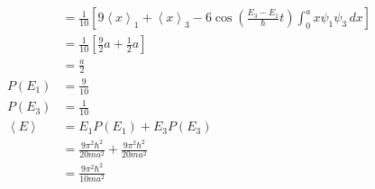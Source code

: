 \documentclass{article}
\newcommand{\ev}[1]{\left< #1 \right>}
\begin{document}
\begin{align*}
             & = \frac{1}{10} \left[ 9 \ev{x}_1 + \ev{x}_3 - 6 \cos \left( \frac{E_3 - E_1}{\hbar} t \right) \int_0^a x \psi_1 \psi_3 \,d x \right]                               \\
             & = \frac{1}{10} \left[ \frac{9}{2} a + \frac{1}{2} a \right]                                                                                                        \\
             & = \frac{a}{2}                                                                                                                                                      \\
  P(E_1)     & = \frac{9}{10}                                                                                                                                                     \\
  P(E_3)     & = \frac{1}{10}                                                                                                                                                     \\
  \ev{E}     & = E_1 P(E_1) + E_3 P(E_3)                                                                                                                                          \\
             & = \frac{9 \pi^2 \hbar^2}{20 m a^2} + \frac{9 \pi^2 \hbar^2}{20 m a^2}                                                                                              \\
             & = \frac{9 \pi^2 \hbar^2}{10 m a^2}
\end{align*}

\subsection{}
\end{document}
